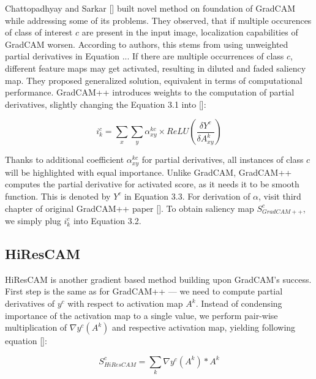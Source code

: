 \noindent
Chattopadhyay and Sarkar [] built novel method on foundation of GradCAM while addressing some of its problems. They observed, that if multiple occurences of class of interest $c$ are present in the input image, localization capabilities of GradCAM worsen. According to authors, this stems from using unweighted partial derivatives in Equation ... If there are multiple occurrences of class $c$, different feature maps may get activated, resulting in diluted and faded saliency map. They proposed generalized solution, equivalent in terms of computational performance. GradCAM++ introduces weights to the computation of partial derivatives, slightly changing the Equation 3.1 into []:

\begin{equation}
    i^c_k = \sum_x \sum_y \alpha^{kc}_{xy} \times ReLU(\frac{\delta Y^c}{\delta A^k_{xy}})
\end{equation}


Thanks to additional coefficient $\alpha^{kc}_{xy}$ for partial derivatives, all instances of class $c$ will be highlighted with equal importance. Unlike GradCAM, GradCAM++ computes the partial derivative for activated score, as it needs it to be smooth function. This is denoted by $Y^c$ in Equation 3.3. For derivation of $\alpha$, visit third chapter of original GradCAM++ paper []. To obtain saliency map $S^c_{GradCAM++}$, we simply plug $i^c_k$ into Equation 3.2.


\subsection{HiResCAM}

HiResCAM is another gradient based method building upon GradCAM's success. First step is the same as for GradCAM++ --- we need to compute partial derivatives of $y^c$ with respect to activation map $A^k$. Instead of condensing importance of the activation map to a single value, we perform pair-wise multiplication of $\nabla y^c(A^k)$ and respective activation map, yielding following equation []: 

\begin{equation}
    S^c_{HiResCAM} = \sum_k \nabla y^c(A^k) * A^k
\end{equation}

